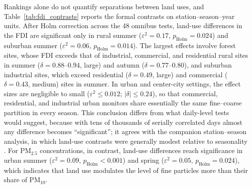 \documentclass[a4paper,fleqn]{cas-sc}
\begin{document}
Rankings alone do not quantify separations between land uses, and Table~\ref{tab:fdi_contrasts} reports the formal contrasts on station--season--year units. After Holm correction across the 48 omnibus tests, land-use differences in the FDI are significant only in rural summer ($\varepsilon^2=0.17$, $p_{\mathrm{Holm}}=0.024$) and suburban summer ($\varepsilon^2=0.06$, $p_{\mathrm{Holm}}=0.014$). The largest effects involve forest sites, whose FDI exceeds that of industrial, commercial, and residential rural sites in summer ($\delta=0.88$--$0.94$, large) and autumn ($\delta=0.77$--$0.80$), and suburban industrial sites, which exceed residential ($\delta=0.49$, large) and commercial ($\delta=0.43$, medium) sites in summer. In urban and center-city settings, the effect sizes are negligible to small ($\varepsilon^2\le0.012$; $|\delta|\le0.24$), so that commercial, residential, and industrial urban monitors share essentially the same fine--coarse partition in every season. This conclusion differs from what daily-level tests would suggest, because with tens of thousands of serially correlated days almost any difference becomes ``significant''; it agrees with the companion station--season analysis, in which land-use contrasts were generally modest relative to seasonality \citep{SierraPorta2026}. For PM$_{2.5}$ concentrations, in contrast, land-use differences reach significance in urban summer ($\varepsilon^2=0.09$, $p_{\mathrm{Holm}}<0.001$) and spring ($\varepsilon^2=0.05$, $p_{\mathrm{Holm}}=0.024$), which indicates that land use modulates the level of fine particles more than their share of PM$_{10}$.
\end{document}
